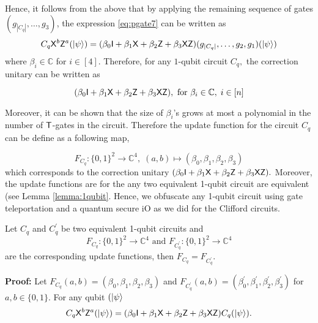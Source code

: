 Hence, it follows from the above that by applying the remaining  sequence of gates $(g_{|C_q|},\ldots,g_3)$, the expression \ref{eq:pgate7} can be written as 
\begin{equation}
\begin{aligned}
\label{eq:pgate8}
C_q {\sf X}^b{\sf Z}^a ({\lvert}\psi\rangle)=(\beta_0 {\sf I} +  \beta_1 {\sf X} + \beta_2 {\sf Z} + \beta_3{\sf X} {\sf Z})(g_{|C_q|},\ldots,g_2,g_1 )({\lvert}\psi\rangle) 
\end{aligned}
\end{equation}
where $\beta_i  \in \mathbb{C}$ for $i\in[4].$  Therefore, for any  $1$-qubit circuit $C_q,$  the correction unitary can be written as  

\begin{equation}
\label{eq:pgate9}
 (\beta_0 {\sf I} +   \beta_1 {\sf X} +  \beta_2 {\sf Z} +  \beta_3 {\sf X}{\sf Z}), \mbox{ for }  \beta_i \in \mathbb{C},\; i\in[n]
\end{equation}

Moreover, it can be shown that the size of $\beta_i$'s grows at most a polynomial in the number of ${\sf T}$-gates in the circuit. Therefore the update function for the circuit $C_q$ can be define as a following map,

\begin{equation*}
F_{C_q}:\{0,1\}^2\rightarrow \mathbb{C}^4,\; (a,b)\mapsto (\beta_0, \beta_1,\beta_2,\beta_3)
\end{equation*}
which corresponds to the correction unitary $(\beta_0 {\sf I} +  \beta_1 {\sf X} + \beta_2 {\sf Z} + \beta_3{\sf X} {\sf Z}).$
Moreover, the update functions are for the any two equivalent 1-qubit circuit are equivalent (see Lemma \ref{lemma:1qubit}. Hence, we obfuscate any 1-qubit circuit using gate teleportation and a quantum secure iO as we did for the Clifford circuits. 



\begin{lemma}
\label{lemma:1qubit}
Let $C_q$ and $C_q^\prime$ be two equivalent 1-qubit circuits and 
\begin{equation*}
F_{C_q}:\{0,1\}^2\rightarrow \mathbb{C}^4 \mbox{ and } F_{C_q^\prime}:\{0,1\}^2\rightarrow \mathbb{C}^4
\end{equation*}
are the corresponding update functions, then $F_{C_q}=F_{C_q^\prime}.$
\end{lemma}

{\bf Proof:} Let  $F_{C_q}(a,b)=(\beta_0, \beta_1, \beta_2, \beta_3)$ and $F_{C_q^\prime}(a,b)=(\beta_0^\prime, \beta_1^\prime, \beta_2^\prime, \beta_3^\prime)$ for $a,b\in\{0,1\}.$ For any qubit $({\lvert}\psi\rangle$
\begin{equation}
\label{lemma:1qubit:eq1}
\begin{aligned}
 C_q {\sf X}^b {\sf Z}^a({\lvert}\psi\rangle)=(\beta_0 {\sf I}+\beta_1 {\sf X}+\beta_2 {\sf Z}+\beta_3 {\sf X} {\sf Z})  C_q ({\lvert}\psi\rangle).\\
 \end{aligned}
\end{equation}

